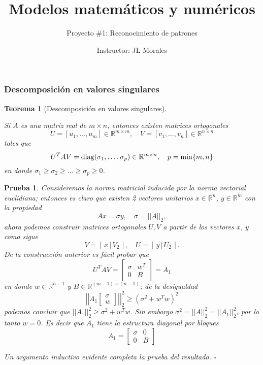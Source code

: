 \documentclass[12pt]{article}
\newtheorem{thm}{Teorema}
\newtheorem{prb}{Prueba}
\newcommand{\real}{\mathbb{R}}
\begin{document}
\title{Modelos matem\'aticos y num\'ericos}
\author{Proyecto \#1: Reconocimiento de patrones}
\date{Instructor: JL Morales}
\maketitle


\subsubsection*{Descomposici\'on en valores singulares}

\begin{thm} [Descomposici\'on en valores singulares] \label{svd} 
 
 Si $A$ es una matriz real de $m \times n$, entonces existen matrices ortogonales
\[
   U = [u_1, \ldots, u_m] \in \real^{m \times m}, \quad
   V = [v_1, \ldots, v_n] \in \real^{n \times n} 
\]
tales que 
\[
  U^TAV = {\rm diag}(\sigma_1, \ldots, \sigma_p) \in \real^{m \times n}, \quad   p = \min \{m,n\}
\]
en donde $\sigma_1 \ge \sigma_2 \ge \ldots \ge \sigma_p \ge 0$.
\end{thm}

\begin{prb}

\bigskip

Consideremos la norma matricial inducida por la norma vectorial euclidiana; entonces es claro que existen 2 vectores unitarios 
$x \in \real^n$, $y \in \real^m$ con la propiedad 
\[
    Ax = \sigma y, \quad \sigma = ||A||_2,
\]
ahora podemos construir matrices ortogonales $U, V$ a partir de los vectores $x$, $y$ como sigue
\[
   V = \left [\, x \,|\,  V_2   \, \right ], \quad  U = \left [ \,y \,|\,  U_2  \, \right ].
\]
De la construcci\'on anterior es f\'acil probar que
\[
   U^TAV = \left [ \begin{array}{cc}  \sigma & w^T \\
                                         0   & B  
                   \end{array} 
            \right ] = A_1   
\]
en donde $w \in \real^{n-1}$ y $B \in \real^{(m-1) \times (n-1)}$;
de la desigualdad 
\[
   \left |\left | A_1   \left [ \begin{array}{c} \sigma \\ w \end{array} \right ] \right |\right|_2^2  \ge ( \sigma^2 + w^Tw )^2
\]
podemos concluir que $||A_1||_2^2 \ge  \sigma^2 + w^Tw$. Sin embargo $\sigma^2 = ||A||_2^2 = ||A_1||_2^2$, por lo tanto $w=0$. Es decir que $A_1$ tiene la estructura diagonal por bloques
\[
 A_1 = \left [ \begin{array}{cc}  \sigma &    0 \\
                                         0   & B  
                   \end{array} 
       \right ]
\]

Un argumento inductivo evidente completa la prueba del resultado. \hfill $\square$

\end{prb}
\end{document}

